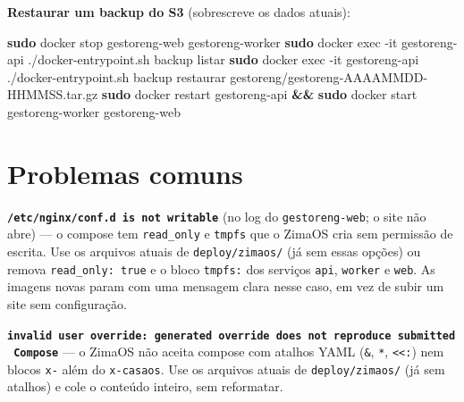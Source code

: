 \documentclass[
  10pt,
]{article}
\newenvironment{Shaded}{\begin{snugshade}}{\end{snugshade}}
\newcommand{\AttributeTok}[1]{\textcolor[rgb]{0.13,0.29,0.53}{#1}}
\newcommand{\FunctionTok}[1]{\textcolor[rgb]{0.13,0.29,0.53}{\textbf{#1}}}
\newcommand{\KeywordTok}[1]{\textcolor[rgb]{0.13,0.29,0.53}{\textbf{#1}}}
\newcommand{\NormalTok}[1]{#1}
\newcommand{\OperatorTok}[1]{\textcolor[rgb]{0.81,0.36,0.00}{\textbf{#1}}}
\newcommand{\VariableTok}[1]{\textcolor[rgb]{0.00,0.00,0.00}{#1}}
\begin{document}
\begin{Shaded}
\end{Shaded}

\textbf{Restaurar um backup do S3} (sobrescreve os dados atuais):

\begin{Shaded}
\begin{Highlighting}[]
\FunctionTok{sudo}\NormalTok{ docker stop gestoreng{-}web gestoreng{-}worker}
\FunctionTok{sudo}\NormalTok{ docker exec }\AttributeTok{{-}it}\NormalTok{ gestoreng{-}api ./docker{-}entrypoint.sh backup listar}
\FunctionTok{sudo}\NormalTok{ docker exec }\AttributeTok{{-}it}\NormalTok{ gestoreng{-}api ./docker{-}entrypoint.sh backup restaurar gestoreng/gestoreng{-}AAAAMMDD{-}HHMMSS.tar.gz}
\FunctionTok{sudo}\NormalTok{ docker restart gestoreng{-}api }\KeywordTok{\&\&} \FunctionTok{sudo}\NormalTok{ docker start gestoreng{-}worker gestoreng{-}web}
\end{Highlighting}
\end{Shaded}

\hypertarget{problemas-comuns}{%
\section{Problemas comuns}\label{problemas-comuns}}

\textbf{\texttt{/etc/nginx/conf.d\ is\ not\ writable}} (no log do
\texttt{gestoreng-web}; o site não abre) --- o compose tem
\texttt{read\_only} e \texttt{tmpfs} que o ZimaOS cria sem permissão de
escrita. Use os arquivos atuais de \texttt{deploy/zimaos/} (já sem essas
opções) ou remova \texttt{read\_only:\ true} e o bloco \texttt{tmpfs:}
dos serviços \texttt{api}, \texttt{worker} e \texttt{web}. As imagens
novas param com uma mensagem clara nesse caso, em vez de subir um site
sem configuração.

\textbf{\texttt{invalid\ user\ override:\ generated\ override\ does\ not\ reproduce\ submitted\ Compose}}
--- o ZimaOS não aceita compose com atalhos YAML (\texttt{\&},
\texttt{*}, \texttt{\textless{}\textless{}:}) nem blocos \texttt{x-}
além do \texttt{x-casaos}. Use os arquivos atuais de
\texttt{deploy/zimaos/} (já sem atalhos) e cole o conteúdo inteiro, sem
reformatar.
\end{document}
